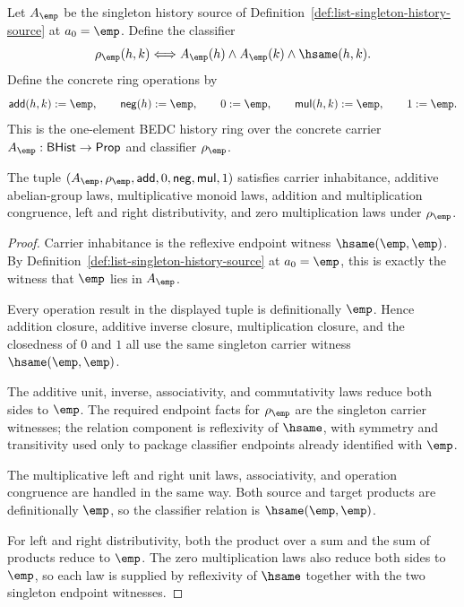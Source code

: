 \begin{definition}
\label{def:singleton-empty-history-ring-instance}
Let $A_{\emp}$ be the singleton history source of
Definition~\ref{def:list-singleton-history-source} at $a_0=\emp$. Define the
classifier
$$
\rho_{\emp}(h,k)\Longleftrightarrow
A_{\emp}(h)\land A_{\emp}(k)\land\hsame(h,k).
$$
Define the concrete ring operations by
$$
\mathsf{add}(h,k):=\emp,\qquad
\mathsf{neg}(h):=\emp,\qquad
0:=\emp,\qquad
\mathsf{mul}(h,k):=\emp,\qquad
1:=\emp.
$$
This is the one-element BEDC history ring over the concrete carrier
$A_{\emp}:\mathsf{BHist}\to\mathsf{Prop}$ and classifier $\rho_{\emp}$.
\end{definition}

\begin{theorem}
\label{thm:singleton-empty-history-ring-laws}
The tuple
$(A_{\emp},\rho_{\emp},\mathsf{add},0,\mathsf{neg},\mathsf{mul},1)$ satisfies
carrier inhabitance, additive abelian-group laws, multiplicative monoid laws,
addition and multiplication congruence, left and right distributivity, and zero
multiplication laws under $\rho_{\emp}$.
\end{theorem}
\begin{proof}
Carrier inhabitance is the reflexive endpoint witness $\hsame(\emp,\emp)$.
By Definition~\ref{def:list-singleton-history-source} at $a_0=\emp$, this is
exactly the witness that $\emp$ lies in $A_{\emp}$.

Every operation result in the displayed tuple is definitionally $\emp$. Hence
addition closure, additive inverse closure, multiplication closure, and the
closedness of $0$ and $1$ all use the same singleton carrier witness
$\hsame(\emp,\emp)$.

The additive unit, inverse, associativity, and commutativity laws reduce both
sides to $\emp$. The required endpoint facts for $\rho_{\emp}$ are the
singleton carrier witnesses; the relation component is reflexivity of
$\hsame$, with symmetry and transitivity used only to package classifier
endpoints already identified with $\emp$.

The multiplicative left and right unit laws, associativity, and operation
congruence are handled in the same way. Both source and target products are
definitionally $\emp$, so the classifier relation is $\hsame(\emp,\emp)$.

For left and right distributivity, both the product over a sum and the sum of
products reduce to $\emp$. The zero multiplication laws also reduce both sides
to $\emp$, so each law is supplied by reflexivity of $\hsame$ together with the
two singleton endpoint witnesses.
\end{proof}

